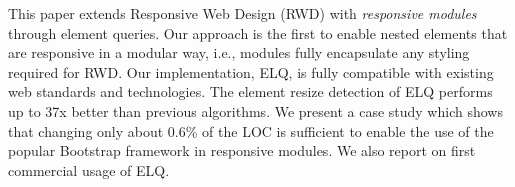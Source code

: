 \documentclass[sigconf,9pt]{acmart}
\newcommand{\elq}{ELQ}
\begin{document}
    This paper extends Responsive Web Design (RWD) with {\em responsive
      modules} through element queries.  Our approach is the first to
    enable nested elements that are responsive in a modular way, i.e.,
    modules fully encapsulate any styling required for RWD.  Our
    implementation, \elq{}, is fully compatible with existing web
    standards and technologies. The element resize detection of \elq{}
    performs up to 37x better than previous algorithms.  We present a
    case study which shows that changing only about 0.6\% of the LOC is
    sufficient to enable the use of the popular Bootstrap framework in
    responsive modules.  We also report on first commercial usage of
    \elq{}.


\end{document}
